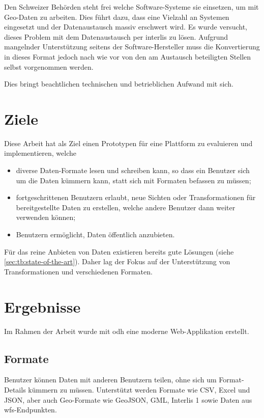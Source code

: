 Den Schweizer Behörden steht frei welche Software-Systeme sie einsetzen, um mit Geo-Daten zu arbeiten. Dies führt dazu, dass eine Vielzahl an Systemen eingesetzt und der Datenaustausch massiv erschwert wird. Es wurde versucht, dieses Problem mit dem Datenaustausch per \gls{interlis} zu lösen. Aufgrund mangelnder Unterstützung seitens der Software-Hersteller muss die Konvertierung in dieses Format jedoch nach wie vor von den am Austausch beteiligten Stellen selbst vorgenommen werden.

Dies bringt beachtlichen technischen und betrieblichen Aufwand mit sich.

\section*{Ziele}

Diese Arbeit hat als Ziel einen Prototypen für eine Plattform zu evaluieren und implementieren, welche
\begin{itemize}
\item diverse Daten-Formate lesen und schreiben kann, so dass ein Benutzer sich um die Daten kümmern kann, statt sich mit Formaten befassen zu müssen;
\item fortgeschrittenen Benutzern erlaubt, neue Sichten oder Transformationen für bereitgestellte Daten zu erstellen, welche andere Benutzer dann weiter verwenden können;
\item Benutzern ermöglicht, Daten öffentlich anzubieten.
\end{itemize}

Für das reine Anbieten von Daten existieren bereits gute Lösungen (siehe \cref{sec:tb:state-of-the-art}). Daher lag der Fokus auf der Unterstützung von Transformationen und verschiedenen Formaten.

\section*{Ergebnisse}
Im Rahmen der Arbeit wurde mit \acf{odh} eine moderne Web-Applikation erstellt.

\subsection*{Formate}
Benutzer können Daten mit anderen Benutzern teilen, ohne sich um Format-Details kümmern zu müssen. Unterstützt werden Formate wie CSV, Excel und JSON, aber auch Geo-Formate wie GeoJSON, GML, Interlis 1 sowie Daten aus \gls{wfs}-Endpunkten.

